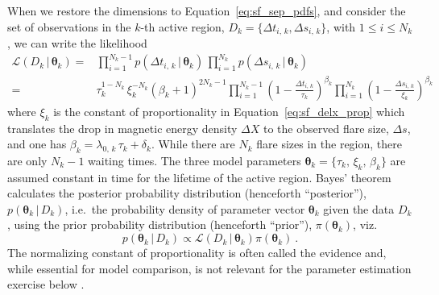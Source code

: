 \begin{subappendices}
When we restore the dimensions to Equation~\eqref{eq:sf_sep_pdfs}, and consider the set of observations in the $k$-th active region, $D_k = \{\Delta t_{i,\,k}, \Delta s_{i,\,k}\}$, with $1 \leq i \leq N_k$, we can write the likelihood
\begin{align}
\mathcal{L}(D_k\,|\,\boldsymbol{\theta}_k) ={}& \prod_{i=1}^{N_k - 1} p(\Delta t_{i,\,k}\,|\,\boldsymbol{\theta}_k)\, \prod_{i=1}^{N_k} p(\Delta s_{i,\,k}\,|\,\boldsymbol{\theta}_k) \\
={}& \tau_k^{1 - N_k}\, \xi_k^{-N_k} \left(\beta_k + 1 \right)^{2N_k - 1} \prod_{i=1}^{N_k - 1} \left(1 - \frac{\Delta t_{i,\,k}}{\tau_k}\right)^{\beta_k} \prod_{i=1}^{N_k}\left(1 - \frac{\Delta s_{i,\,k}}{\xi_k} \right)^{\beta_k} \label{eq:sf_full_l}
\end{align}
where $\xi_k$ is the constant of proportionality in Equation~\eqref{eq:sf_delx_prop} which translates the drop in magnetic energy density $\Delta X$ to the observed flare size, $\Delta s$, and one has $\beta_k = \lambda_{0,\,k}\, \tau_k + \delta_k$. While there are $N_k$ flare sizes in the region, there are only $N_k - 1$ waiting times. The three model parameters $\boldsymbol{\theta}_k = \{\tau_k,\, \xi_k,\, \beta_k \}$ are assumed constant in time for the lifetime of the active region. Bayes' theorem calculates the posterior probability distribution (henceforth ``posterior''), $p(\boldsymbol{\theta}_k\,|\,D_k)$, i.e.~the probability density of parameter vector $\boldsymbol{\theta}_k$ given the data $D_k$, using the prior probability distribution (henceforth ``prior''),
 $\pi(\boldsymbol{\theta}_k)$, viz.
\begin{equation}
p(\boldsymbol{\theta}_k\,|\,D_k) \propto \mathcal{L}(D_k\,|\,\boldsymbol{\theta}_k) \pi(\boldsymbol{\theta}_k)\ .
\end{equation}
The normalizing constant of proportionality is often called the evidence and, while essential for model comparison, is not relevant for the parameter estimation exercise below \citep{Gelman2013}.


\end{subappendices}
